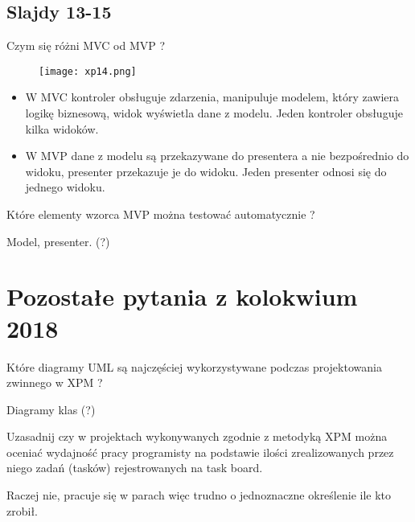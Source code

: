 \documentclass[a4paper,15pt]{article}
\newcommand{\question}[2]{
    \begin{tcolorbox}[colback=mRed!5!white,colframe=mRed,title={Kolokwium 2018 #1}]
        #2
    \end{tcolorbox}
}
\begin{document}
\subsection{Slajdy 13-15}
\begin{framed}
Czym się różni MVC od MVP ?
\end{framed}
\begin{figure}[H]
\centerline{\texttt{[image: xp14.png]}}
\end{figure}
\begin{itemize}
\item W MVC kontroler obsługuje zdarzenia, manipuluje modelem, który zawiera logikę biznesową, widok wyświetla dane z modelu. Jeden kontroler obsługuje kilka widoków.
\item W MVP dane z modelu są przekazywane do presentera a nie bezpośrednio do widoku, presenter przekazuje je do widoku. Jeden presenter odnosi się do jednego widoku.
\end{itemize}

\question{}{
Które elementy wzorca MVP można testować automatycznie ?
}
Model, presenter. (?)

\section{Pozostałe pytania z kolokwium 2018}


\question{}{
Które diagramy UML są najczęściej wykorzystywane podczas projektowania zwinnego w XPM ?
}
Diagramy klas (?)

\question{}{
Uzasadnij czy w projektach wykonywanych zgodnie z metodyką XPM można oceniać wydajność pracy programisty na podstawie ilości zrealizowanych przez niego zadań (tasków) rejestrowanych na task board. 
}
Raczej nie, pracuje się w parach więc trudno o jednoznaczne określenie ile kto zrobił. 
\end{document}

